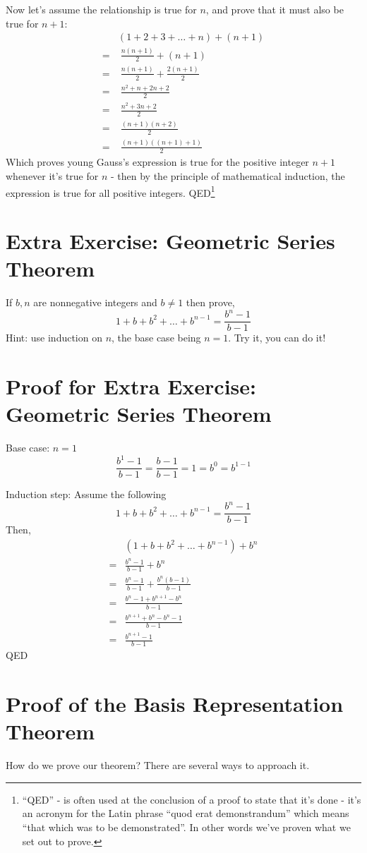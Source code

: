\documentclass{article}
\begin{document}
Now let's assume the relationship is true for $n$,
and prove that it must also be true for $n+1$:
\begin{align*}
&(1+2+3+\ldots+n) + (n+1)\\
= & \; \frac{n(n+1)}{2} + (n+1)\\
= & \; \frac{n(n+1)}{2} + \frac{2(n+1)}{2}\\
= & \; \frac{n^2+n+2n+2}{2}\\
= & \; \frac{n^2+3n+2}{2}\\
= & \; \frac{(n+1)(n+2)}{2}\\
= & \; \frac{(n+1)((n+1)+1)}{2}
\end{align*}
Which proves young Gauss's expression is true for
the positive integer $n+1$ whenever it's true for $n$ - then
by the principle of mathematical induction,
the expression is true for all positive integers. QED\footnote{``QED'' - is
often used at the conclusion of a proof to state that it's
done - it's an acronym for the Latin phrase
``quod erat demonstrandum'' which means ``that which was to be demonstrated''.
In other words we've proven what we set out to prove.}

\section*{Extra Exercise: Geometric Series Theorem}
If $b, n$ are nonnegative integers and $b\ne1$ then prove,
\[1+b+b^2+\dots+b^{n-1} = \frac{b^n-1}{b-1}\]
Hint: use induction on $n$, the base case being $n=1$.  Try it, you can do it!

\section*{Proof for Extra Exercise: Geometric Series Theorem}
Base case: $n=1$
\[\frac{b^1-1}{b-1}=\frac{b-1}{b-1}=1=b^0=b^{1-1}\]

Induction step:
Assume the following
\[1+b+b^2+\dots+b^{n-1} = \frac{b^n-1}{b-1}\]
Then,
\begin{align*}
&(1+b+b^2+\dots+b^{n-1}) + b^n\\
= &\frac{b^n-1}{b-1}+b^n\\
= &\frac{b^n-1}{b-1}+\frac{b^n(b-1)}{b-1}\\
= &\frac{b^n-1+b^{n+1}-b^n}{b-1}\\
= &\frac{b^{n+1}+b^n-b^n-1}{b-1}\\
= &\frac{b^{n+1}-1}{b-1}
\end{align*}
QED
\section*{Proof of the  Basis Representation Theorem}
How do we prove our theorem? There are several ways to approach it.
\end{document}
